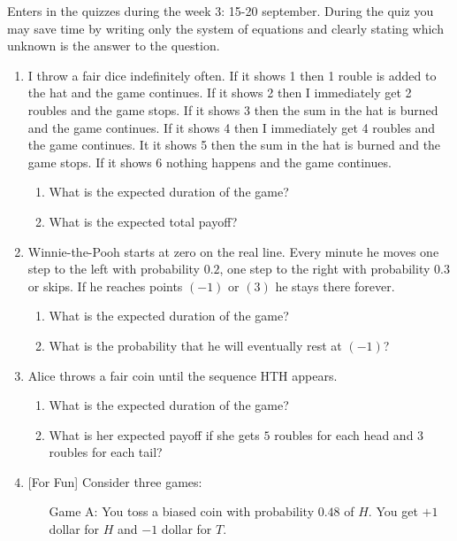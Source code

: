\documentclass[12pt]{article}
\begin{document}
Enters in the quizzes during the week 3: 15-20 september. 
During the quiz you may save time by writing only the system of equations and clearly stating which unknown is the answer to the question.

\begin{enumerate}
\item I throw a fair dice indefinitely often. 
If it shows 1 then 1 rouble is added to the hat and the game continues.
If it shows 2 then I immediately get 2 roubles and the game stops. 
If it shows 3 then the sum in the hat is burned and the game continues.
If it shows 4 then I immediately get 4 roubles and the game continues. 
It it shows 5 then the sum in the hat is burned and the game stops. 
If it shows 6 nothing happens and the game continues. 
\begin{enumerate}
    \item What is the expected duration of the game?
    \item What is the expected total payoff?
\end{enumerate}

\item Winnie-the-Pooh starts at zero on the real line. 
Every minute he moves one step to the left with probability $0.2$, one step to the right with probability $0.3$ or skips. 
If he reaches points $(-1)$ or $(3)$ he stays there forever. 

\begin{enumerate}
    \item What is the expected duration of the game?
    \item What is the probability that he will eventually rest at $(-1)$?
\end{enumerate}

\item Alice throws a fair coin until the sequence HTH appears.

\begin{enumerate}
    \item What is the expected duration of the game?
    \item What is her expected payoff if she gets $5$ roubles for each head and $3$ roubles for each tail?
\end{enumerate}

    \item {[For Fun]} Consider three games:
    \begin{enumerate}
        \item[Game A:] You toss a biased coin with probability $0.48$ of $H$. 
        You get $+1$ dollar for $H$ and $-1$ dollar for $T$.  


\end{enumerate}
\end{enumerate}
\end{document}
